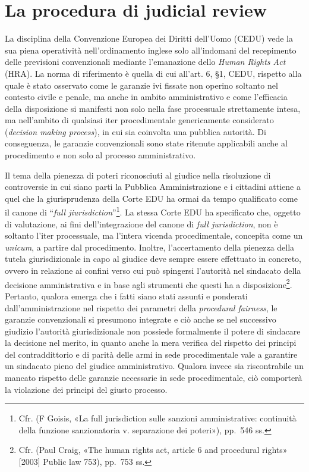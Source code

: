 \documentclass[12pt,it,a4paper,]{report}
\begin{document}
\hypertarget{la-procedura-di-judicial-review}{%
\section{La procedura di judicial
review}\label{la-procedura-di-judicial-review}}

La disciplina della Convenzione Europea dei Diritti dell'Uomo (CEDU)
vede la sua piena operatività nell'ordinamento inglese solo all'indomani
del recepimento delle previsioni convenzionali mediante l'emanazione
dello \emph{Human Rights Act} (HRA). La norma di riferimento è quella di
cui all'art. 6, §1, CEDU, rispetto alla quale è stato osservato come le
garanzie ivi fissate non operino soltanto nel contesto civile e penale,
ma anche in ambito amministrativo e come l'efficacia della disposizione
si manifesti non solo nella fase processuale strettamente intesa, ma
nell'ambito di qualsiasi iter procedimentale genericamente considerato
(\emph{decision making process}), in cui sia coinvolta una pubblica
autorità. Di conseguenza, le garanzie convenzionali sono state ritenute
applicabili anche al procedimento e non solo al processo amministrativo.

Il tema della pienezza di poteri riconosciuti al giudice nella
risoluzione di controversie in cui siano parti la Pubblica
Amministrazione e i cittadini attiene a quel che la giurisprudenza della
Corte EDU ha ormai da tempo qualificato come il canone di ``\emph{full
jiurisdiction}''\footnote{Cfr. (F Goisis, {«La full jurisdiction sulle
  sanzioni amministrative: continuità della funzione sanzionatoria v.
  separazione dei poteri»}), pp.~546 ss.}. La stessa Corte EDU ha
specificato che, oggetto di valutazione, ai fini dell'integrazione del
canone di \emph{full jurisdiction}, non è soltanto l'iter processuale,
ma l'intera vicenda procedimentale, concepita come un \emph{unicum}, a
partire dal procedimento. Inoltre, l'accertamento della pienezza della
tutela giurisdizionale in capo al giudice deve sempre essere effettuato
in concreto, ovvero in relazione ai confini verso cui può spingersi
l'autorità nel sindacato della decisione amministrativa e in base agli
strumenti che questi ha a disposizione\footnote{Cfr. (Paul Craig, {«The
  human rights act, article 6 and procedural rights»} {[}2003{]} Public
  law 753), pp.~753 ss.}. Pertanto, qualora emerga che i fatti siano
stati assunti e ponderati dall'amministrazione nel rispetto dei
parametri della \emph{procedural fairness}, le garanzie convenzionali si
presumono integrate e ciò anche se nel successivo giudizio l'autorità
giurisdizionale non possiede formalmente il potere di sindacare la
decisione nel merito, in quanto anche la mera verifica del rispetto dei
principi del contraddittorio e di parità delle armi in sede
procedimentale vale a garantire un sindacato pieno del giudice
amministrativo. Qualora invece sia riscontrabile un mancato rispetto
delle garanzie necessarie in sede procedimentale, ciò comporterà la
violazione dei principi del giusto processo.
\end{document}
